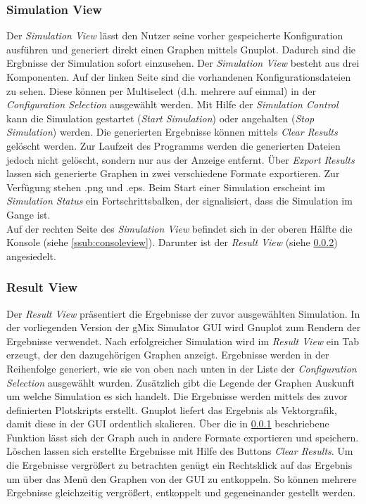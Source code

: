 \documentclass[a4paper, 11pt]{article} %
\begin{document}
\subsubsection{Simulation View} %
\label{ssub:simulationview}
Der \emph{Simulation View} lässt den Nutzer seine vorher gespeicherte Konfiguration ausführen und generiert direkt einen Graphen mittels Gnuplot. Dadurch sind die Ergbnisse der Simulation sofort einzusehen. Der \emph{Simulation View} besteht aus drei Komponenten. Auf der linken Seite sind die vorhandenen Konfigurationsdateien zu sehen. Diese können per Multiselect (d.h. mehrere auf einmal) in der \emph{Configuration Selection} ausgewählt werden. Mit Hilfe der \emph{Simulation Control} kann die Simulation gestartet (\emph{Start Simulation}) oder angehalten (\emph{Stop Simulation}) werden. Die generierten Ergebnisse können mittels \emph{Clear Results} gelöscht werden. Zur Laufzeit des Programms werden die generierten Dateien jedoch nicht gelöscht, sondern nur aus der Anzeige entfernt. Über \emph{Export Results} lassen sich generierte Graphen in zwei verschiedene Formate exportieren. Zur Verfügung stehen .png und .eps. Beim Start einer Simulation erscheint im \emph{Simulation Status} ein Fortschrittsbalken, der signalisiert, dass die Simulation im Gange ist. \\
Auf der rechten Seite des \emph{Simulation View} befindet sich in der oberen Hälfte die Konsole (siehe \ref{ssub:consoleview}). Darunter ist der \emph{Result View} (siehe \ref{ssub:resultview}) angesiedelt.

\subsubsection{Result View} %
\label{ssub:resultview}
Der \emph{Result View} präsentiert die Ergebnisse der zuvor ausgewählten Simulation. In der vorliegenden Version der gMix Simulator GUI wird Gnuplot zum Rendern der Ergebnisse verwendet. Nach erfolgreicher Simulation wird im \emph{Result View} ein Tab erzeugt, der den dazugehörigen Graphen anzeigt. Ergebnisse werden in der Reihenfolge generiert, wie sie von oben nach unten in der Liste der \emph{Configuration Selection} ausgewählt wurden. Zusätzlich gibt die Legende der Graphen Auskunft um welche Simulation es sich handelt. Die Ergebnisse werden mittels des zuvor definierten Plotskripts erstellt. Gnuplot liefert das Ergebnis als Vektorgrafik, damit diese in der GUI ordentlich skalieren. Über die in \ref{ssub:simulationview} beschriebene Funktion lässt sich der Graph auch in andere Formate exportieren und speichern. Löschen lassen sich erstellte Ergebnisse mit Hilfe des Buttons \emph{Clear Results}. Um die Ergebnisse vergrößert zu betrachten genügt ein Rechtsklick auf das Ergebnis um über das Menü den Graphen von der GUI zu entkoppeln. So können mehrere Ergebnisse gleichzeitig vergrößert, entkoppelt und gegeneinander gestellt werden. 
\end{document}
